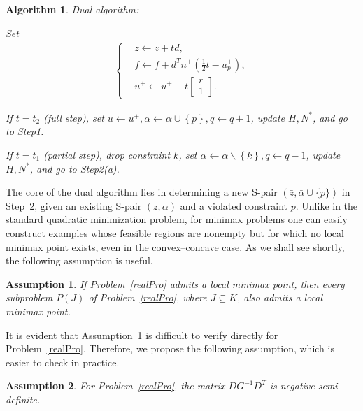 \documentclass{article}
\newtheorem{assumption}{Assumption}
\newtheorem{algorithm}{Algorithm}
\begin{document}
\begin{algorithm}{Dual algorithm:}
\begin{enumerate}
\begin{enumerate}
\begin{enumerate}
					Set
					\begin{align*}
						\left\lbrace\begin{aligned}
							&z \leftarrow z + td,\\
							&f \leftarrow f + d^{T} n^{+} \left(\frac{1}{2}t - u_{p}^{+}\right),\\
							&u^{+} \leftarrow u^{+} - t\begin{bmatrix}
								r\\1
							\end{bmatrix} .
						\end{aligned}\right.
					\end{align*}
				\end{enumerate}
				If $t = t_{2}$ (full step), set $u\leftarrow u^{+},\alpha\leftarrow\alpha\cup\left\lbrace p\right\rbrace,q\leftarrow q + 1$, update $H,N^{\ast}$, and go to Step1.
				
				If $t = t_{1}$ (partial step), drop constraint $k$, set $\alpha\leftarrow\alpha\backslash\left\lbrace k\right\rbrace, q\leftarrow q-1$, update $H,N^{\ast}$, and go to Step2(a).
				\end{enumerate}
		\end{enumerate}
	\end{algorithm}
	
	The core of the dual algorithm lies in determining a new S-pair $(\bar{z}, \bar{\alpha} \cup \{ p \})$ in Step~2, given an existing S-pair $(z, \alpha)$ and a violated constraint $p$.  
	Unlike in the standard quadratic minimization problem, for minimax problems one can easily construct examples whose feasible regions are nonempty but for which no local minimax point exists, even in the convex–concave case.  
	As we shall see shortly, the following assumption is useful.
	
	\begin{assumption}\label{assumption}
		If Problem~\eqref{realPro} admits a local minimax point, then every subproblem $P(J)$ of Problem~\eqref{realPro}, where $J \subseteq K$, also admits a local minimax point.
	\end{assumption}
	
	It is evident that Assumption~\ref{assumption} is difficult to verify directly for Problem~\eqref{realPro}.  
	Therefore, we propose the following assumption, which is easier to check in practice.
	
	\begin{assumption}\label{assumption2}
		For Problem~\eqref{realPro}, the matrix $D G^{-1} D^{T}$ is negative semi-definite.
	\end{assumption}
	
\end{document}
